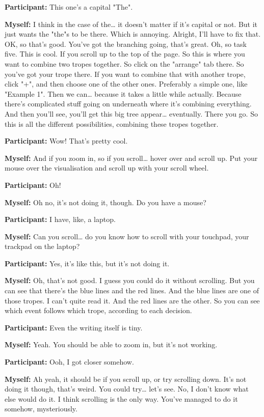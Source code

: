 \documentclass[11pt]{report}
\newcommand{\llabel}[1]{\hypertarget{llineno:#1}{\linelabel{#1}}}
\begin{document}
\begin{linenumbers}
\textbf{Participant:} This one's a capital "The".

\textbf{Myself:} I think in the case of the\ldots{} it doesn't matter if it's
capital or not. But it just wants the "the"s to be there. Which is annoying.
Alright, I'll have to fix that. OK, so that's good. You've got the branching
going, that's great. Oh, so task five. This is cool. If you scroll up to the top
of the page. So this is where you want to combine two tropes together. So click
on the "arrange" tab there. So you've got your trope there. If you want to
combine that with another trope, click "+", and then choose one of the other
ones. Preferably a simple one, like "Example 1". Then we can\ldots{} because it
takes a little while actually. Because there's complicated stuff going on
underneath where it's combining everything. And then you'll see, you'll get this
big tree appear\ldots{} eventually. There you go. So this is all the different
possibilities, combining these tropes together.\llabel{lne:syntax3c}

\textbf{Participant:} Wow! That's pretty cool.

\textbf{Myself:} And if you zoom in, so if you scroll\ldots{} hover over and scroll up. Put your mouse over the visualisation and scroll up with your scroll wheel.

\textbf{Participant:} Oh!

\textbf{Myself:} Oh no, it's not doing it, though. Do you have a mouse?

\textbf{Participant:} I have, like, a laptop.

\textbf{Myself:} Can you scroll\ldots{} do you know how to scroll with your touchpad, your trackpad on the laptop?

\textbf{Participant:} Yes, it's like this, but it's not doing it.

\textbf{Myself:} Oh, that's not good. I guess you could do it without scrolling. But you can see that there's the blue lines and the red lines. And the blue lines are one of those tropes. I can't quite read it. And the red lines are the other. So you can see which event follows which trope, according to each decision.

\textbf{Participant:} Even the writing itself is tiny.

\textbf{Myself:} Yeah. You should be able to zoom in, but it's not working.

\textbf{Participant:} Ooh, I got closer somehow.

\textbf{Myself:} Ah yeah, it should be if you scroll up, or try scrolling down. It's not doing it though, that's weird. You could try\ldots{} let's see. No, I don't know what else would do it. I think scrolling is the only way. You've managed to do it somehow, mysteriously.


\end{linenumbers}
\end{document}
